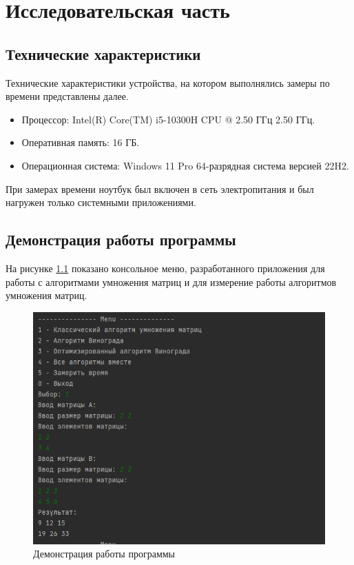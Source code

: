 \chapter{Исследовательская часть}

\section{Технические характеристики}

Технические характеристики устройства, на котором выполнялись замеры по времени представлены далее.

\begin{itemize}
	\item Процессор: Intel(R) Core(TM) i5-10300H CPU @ 2.50 ГГц 2.50 ГГц. \cite{intel}
	\item Оперативная память: 16 ГБ.
	\item Операционная система: Windows 11 Pro 64-разрядная система версией 22H2. \cite{windows}
\end{itemize}

При замерах времени ноутбук был включен в сеть электропитания и был нагружен только системными приложениями.

\clearpage

\section{Демонстрация работы программы}

На рисунке \ref{img:demonstration} показано консольное меню, разработанного приложения для работы с алгоритмами умножения матриц и для измерение работы алгоритмов умножения матриц.

\begin{figure}[h]
	\centering
	\includegraphics[height=0.5\textheight]{img/example.png}
	\caption{Демонстрация работы программы}
	\label{img:demonstration}
\end{figure}

